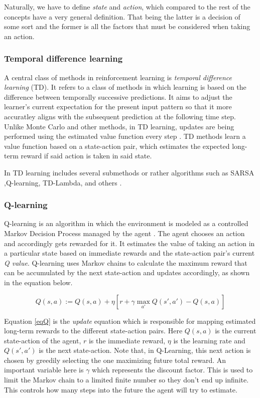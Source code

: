 Naturally, we have to define \textit{state} and \textit{action}, which compared to the rest of the concepts have a very general definition. 
That being the latter is a decision of some sort and the former is all the factors that must be considered when taking an action. 

\subsubsection{Temporal difference learning}

A central class of methods in reinforcement learning is \textit{temporal difference learning} (TD). 
It refers to a class of methods in which learning is based on the difference between temporally successive predictions. 
It aims to adjust the learner's current expectation for the present input pattern so that it more accuratley aligns with the subsequent prediction at the following time step. 
Unlike Monte Carlo and other methods, in TD learning, updates are being performed using the estimated value function every step \cite{tesauro1995temporal}.  
TD methods learn a value function based on a state-action pair, which estimates the expected long-term reward if said action is taken in said state. 

In TD learning includes several submethods or rather algorithms such as SARSA ,Q-learning, TD-Lambda, and others \cite{eiben2007reinforcement}.\\

\subsubsection{Q-learning}
Q-learning is an algorithm in which the environment is modeled as a controlled Markov Decision Process managed by the agent \cite{watkins1992q}. 
The agent chooses an action and accordingly gets rewarded for it. 
It estimates the value of taking an action in a particular state based on immediate rewards and the state-action pair's current \textit{Q value}. 
Q-learning uses Markov chains to calculate the maximum reward that can be accumulated by the next state-action and updates accordingly, as shown in the equation below.

\begin{equation} \label{eqQ}
    { Q(s,a) := Q(s,a) + \eta [r + \gamma \max_{a'} Q(s',a') - Q(s,a)]}
\end{equation}

Equation \ref{eqQ} is the \textit{update} equation which is responsible for mapping estimated long-term rewards to the different state-action pairs. 
Here $Q(s,a)$ is the current state-action of the agent, $r$ is the immediate reward, $\eta$ is the learning rate and $Q(s',a')$ is the next state-action. 
Note that, in Q-Learning, this next action is chosen by greedily selecting the one maximizing future total reward.
An important variable here is $\gamma$ which represents the discount factor. This is used to limit the Markov chain to a limited finite number so they don't end up infinite. This controls how many steps into the future the agent will try to estimate. 


